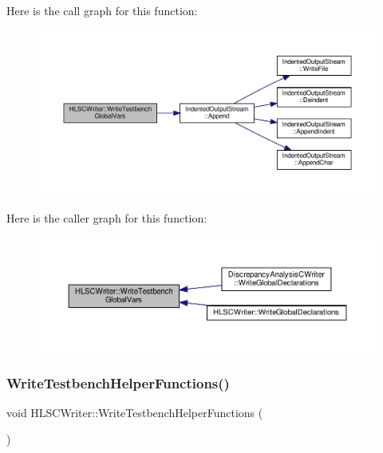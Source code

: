 Here is the call graph for this function\+:
\nopagebreak
\begin{figure}[H]
\begin{center}
\leavevmode
\includegraphics[width=350pt]{d4/db1/classHLSCWriter_a5fdaae40bf4d22a922ce36aa8439f92b_cgraph}
\end{center}
\end{figure}
Here is the caller graph for this function\+:
\nopagebreak
\begin{figure}[H]
\begin{center}
\leavevmode
\includegraphics[width=350pt]{d4/db1/classHLSCWriter_a5fdaae40bf4d22a922ce36aa8439f92b_icgraph}
\end{center}
\end{figure}
\mbox{\label{classHLSCWriter_a6eb118ed175fcbc9d2ab94c8e71ce420}} 
\subsubsection{\texorpdfstring{Write\+Testbench\+Helper\+Functions()}{WriteTestbenchHelperFunctions()}}
{\footnotesize\ttfamily void H\+L\+S\+C\+Writer\+::\+Write\+Testbench\+Helper\+Functions (\begin{DoxyParamCaption}{ }\end{DoxyParamCaption})\hspace{0.3cm}{\ttfamily [protected]}}



